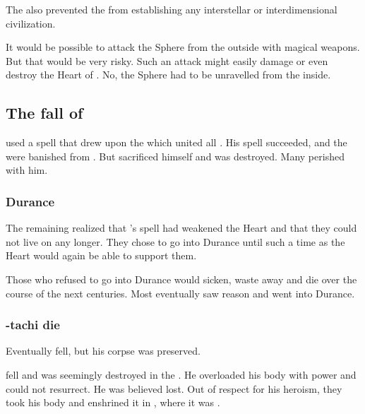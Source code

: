 The \CrystalSphere also prevented the \Miithians from establishing any interstellar or interdimensional civilization.

It would be possible to attack the Sphere from the outside with magical weapons. 
But that would be very risky. 
Such an attack might easily damage or even destroy the Heart of \Miith. 
No, the Sphere had to be unravelled from the inside. 









\subsection{The fall of \Sethicus}
\Sethicus used a spell that drew upon the \matrix which united all \dragons.
His spell succeeded, and the \banes were banished from \Miith. 
But \Sethicus sacrificed himself and was destroyed. 
Many \dragons perished with him.





\subsubsection{Durance}
The remaining \dragons realized that \Sethicus's spell had weakened the Heart and that they could not live on \Miith any longer.
They chose to go into Durance until such a time as the Heart would again be able to support them. 

Those \dragons who refused to go into Durance would sicken, waste away and die over the course of the next centuries. 
Most \dragons eventually saw reason and went into Durance. 





\subsubsection{\Sethicus-tachi die}
Eventually \Sethicus fell, but his corpse was preserved.

\Sethicus fell and was seemingly destroyed in the \firstbanewar.
He overloaded his body with power and could not resurrect.
He was believed lost.
Out of respect for his heroism, they took his body and enshrined it in , where it was . 

















